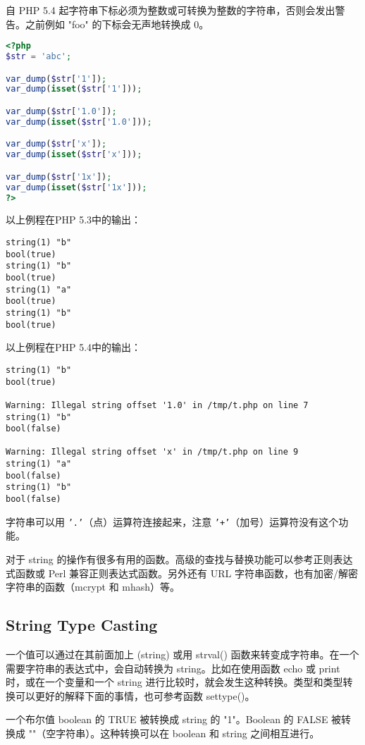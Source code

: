 自 PHP 5.4 起字符串下标必须为整数或可转换为整数的字符串，否则会发出警告。之前例如 "foo" 的下标会无声地转换成 0。


\begin{lstlisting}[language=PHP]
<?php
$str = 'abc';

var_dump($str['1']);
var_dump(isset($str['1']));

var_dump($str['1.0']);
var_dump(isset($str['1.0']));

var_dump($str['x']);
var_dump(isset($str['x']));

var_dump($str['1x']);
var_dump(isset($str['1x']));
?>
\end{lstlisting}

以上例程在PHP 5.3中的输出：

\begin{verbatim}
string(1) "b"
bool(true)
string(1) "b"
bool(true)
string(1) "a"
bool(true)
string(1) "b"
bool(true)
\end{verbatim}

以上例程在PHP 5.4中的输出：

\begin{verbatim}
string(1) "b"
bool(true)

Warning: Illegal string offset '1.0' in /tmp/t.php on line 7
string(1) "b"
bool(false)

Warning: Illegal string offset 'x' in /tmp/t.php on line 9
string(1) "a"
bool(false)
string(1) "b"
bool(false)
\end{verbatim}

字符串可以用 \texttt{'.'}（点）运算符连接起来，注意 \texttt{'+'}（加号）运算符没有这个功能。

对于 string 的操作有很多有用的函数。高级的查找与替换功能可以参考正则表达式函数或 Perl 兼容正则表达式函数。另外还有 URL 字符串函数，也有加密/解密字符串的函数（mcrypt 和 mhash）等。

\subsection{String Type Casting}

一个值可以通过在其前面加上 (string) 或用 strval() 函数来转变成字符串。在一个需要字符串的表达式中，会自动转换为 string。比如在使用函数 echo 或 print 时，或在一个变量和一个 string 进行比较时，就会发生这种转换。类型和类型转换可以更好的解释下面的事情，也可参考函数 settype()。

一个布尔值 boolean 的 TRUE 被转换成 string 的 "1"。Boolean 的 FALSE 被转换成 ""（空字符串）。这种转换可以在 boolean 和 string 之间相互进行。

